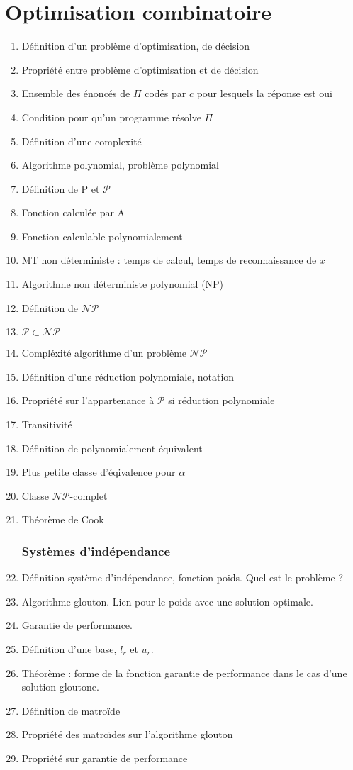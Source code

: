 \documentclass[11pt, twocolumn, landscape]{article}
\begin{document}
\part{Optimisation combinatoire}
\begin{enumerate}
\section{Problèmes polynomiaux}
	\item Définition d'un problème d'optimisation, de décision
	\item Propriété entre problème d'optimisation et de décision
	\item Ensemble des énoncés de $\Pi$ codés par $c$ pour lesquels la réponse est oui
	\item Condition pour qu'un programme résolve $\Pi$
	\item Définition d'une complexité
	\item Algorithme polynomial, problème polynomial
	\item Définition de P et $\mathcal{P}$
	\item Fonction calculée par A
	\item Fonction calculable polynomialement
	\item MT non déterministe : temps de calcul, temps de reconnaissance de $x$
	\item Algorithme non déterministe polynomial (NP)
	\item Définition de $\mathcal{N}\mathcal{P}$
	\item $\mathcal{P}\subset\mathcal{N}\mathcal{P}$
	\item Compléxité algorithme d'un problème $\mathcal{NP}$
	\item Définition d'une réduction polynomiale, notation
	\item Propriété sur l'appartenance à $\mathcal{P}$ si réduction polynomiale
	\item Transitivité
	\item Définition de polynomialement équivalent
	\item Plus petite classe d'éqivalence pour $\alpha$
	\item Classe $\mathcal{NP}$-complet
	\item Théorème de Cook
\section{Systèmes d'indépendance}
	\item Définition système d'indépendance, fonction poids. Quel est le problème ?
	\item Algorithme glouton. Lien pour le poids avec une solution optimale.
	\item Garantie de performance.
	\item Définition d'une base, $l_r$ et $u_r$.
	\item Théorème : forme de la fonction garantie de performance dans le cas d'une solution gloutone.
	\item Définition de matroïde
	\item Propriété des matroïdes sur l'algorithme glouton
	\item Propriété sur garantie de performance

\end{enumerate}
\end{document}
